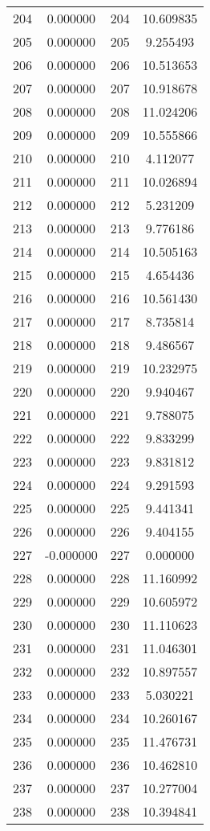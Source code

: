 \documentclass[12pt]{article}
\begin{document}
\begin{longtable}{@{}cccc@{}}
204 & 0.000000 & 204 & 10.609835 \\
205 & 0.000000 & 205 & 9.255493 \\
206 & 0.000000 & 206 & 10.513653 \\
207 & 0.000000 & 207 & 10.918678 \\
208 & 0.000000 & 208 & 11.024206 \\
209 & 0.000000 & 209 & 10.555866 \\
210 & 0.000000 & 210 & 4.112077 \\
211 & 0.000000 & 211 & 10.026894 \\
212 & 0.000000 & 212 & 5.231209 \\
213 & 0.000000 & 213 & 9.776186 \\
214 & 0.000000 & 214 & 10.505163 \\
215 & 0.000000 & 215 & 4.654436 \\
216 & 0.000000 & 216 & 10.561430 \\
217 & 0.000000 & 217 & 8.735814 \\
218 & 0.000000 & 218 & 9.486567 \\
219 & 0.000000 & 219 & 10.232975 \\
220 & 0.000000 & 220 & 9.940467 \\
221 & 0.000000 & 221 & 9.788075 \\
222 & 0.000000 & 222 & 9.833299 \\
223 & 0.000000 & 223 & 9.831812 \\
224 & 0.000000 & 224 & 9.291593 \\
225 & 0.000000 & 225 & 9.441341 \\
226 & 0.000000 & 226 & 9.404155 \\
227 & -0.000000 & 227 & 0.000000 \\
228 & 0.000000 & 228 & 11.160992 \\
229 & 0.000000 & 229 & 10.605972 \\
230 & 0.000000 & 230 & 11.110623 \\
231 & 0.000000 & 231 & 11.046301 \\
232 & 0.000000 & 232 & 10.897557 \\
233 & 0.000000 & 233 & 5.030221 \\
234 & 0.000000 & 234 & 10.260167 \\
235 & 0.000000 & 235 & 11.476731 \\
236 & 0.000000 & 236 & 10.462810 \\
237 & 0.000000 & 237 & 10.277004 \\
238 & 0.000000 & 238 & 10.394841 \\

\end{longtable}
\end{document}
